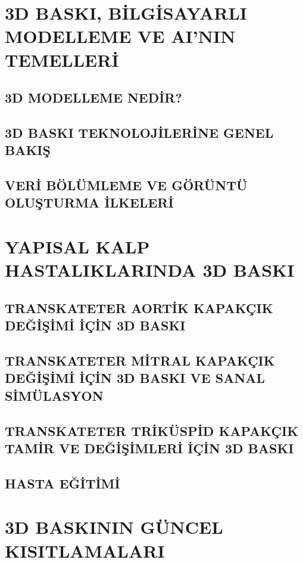 \documentclass{IEEEtran}
\begin{document}
\section{3D BASKI, BİLGİSAYARLI MODELLEME VE AI'NIN TEMELLERİ}
\label{sec:3d}

\subsection{3D MODELLEME NEDİR?}
\label{subsec:nedir}

\subsection{3D BASKI TEKNOLOJİLERİNE GENEL BAKIŞ}
\label{subsec:genel}

\subsection{VERİ BÖLÜMLEME VE GÖRÜNTÜ OLUŞTURMA İLKELERİ}
\label{subsec:veri}

\section{YAPISAL KALP HASTALIKLARINDA 3D BASKI}
\label{sec:yapısal}

\subsection{TRANSKATETER AORTİK KAPAKÇIK DEĞİŞİMİ İÇİN 3D BASKI}
\label{subsec:aortik}

\subsection{TRANSKATETER MİTRAL KAPAKÇIK DEĞİŞİMİ İÇİN 3D BASKI VE SANAL SİMÜLASYON}
\label{subsec:mitral}

\subsection{TRANSKATETER TRİKÜSPİD KAPAKÇIK TAMİR VE DEĞİŞİMLERİ İÇİN 3D BASKI}
\label{subsec:tri}

\subsection{HASTA EĞİTİMİ}
\label{subsec:hasta}

\section{3D BASKININ GÜNCEL KISITLAMALARI}
\label{sec:yapısal}
\end{document}
